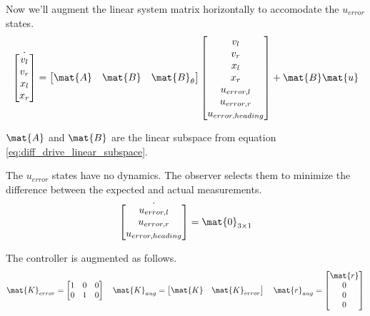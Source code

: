 Now we'll augment the linear system matrix horizontally to accomodate the
$u_{error}$ states.
\begin{equation}
  \dot{\begin{bmatrix}
    v_l \\
    v_r \\
    x_l \\
    x_r
  \end{bmatrix}} =
    \begin{bmatrix}
      \mat{A} & \mat{B} & \mat{B}_{\theta}
    \end{bmatrix}
    \begin{bmatrix}
      v_l \\
      v_r \\
      x_l \\
      x_r \\
      u_{error,l} \\
      u_{error,r} \\
      u_{error,heading}
    \end{bmatrix} + \mat{B}\mat{u}
\end{equation}

$\mat{A}$ and $\mat{B}$ are the linear subspace from equation
\eqref{eq:diff_drive_linear_subspace}.

The $u_{error}$ states have no dynamics. The observer selects them to minimize
the difference between the expected and actual measurements.
\begin{equation}
  \dot{\begin{bmatrix}
    u_{error,l} \\
    u_{error,r} \\
    u_{error,heading}
  \end{bmatrix}} = \mat{0}_{3 \times 1}
\end{equation}

The controller is augmented as follows.
\begin{equation}
  \mat{K}_{error} =
  \begin{bmatrix}
    1 & 0 & 0 \\
    0 & 1 & 0
  \end{bmatrix}
  \quad
  \mat{K}_{aug} = \begin{bmatrix}
    \mat{K} & \mat{K}_{error}
  \end{bmatrix}
  \quad
  \mat{r}_{aug} = \begin{bmatrix}
    \mat{r} \\
    0 \\
    0 \\
    0
  \end{bmatrix}
\end{equation}

